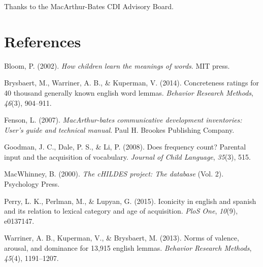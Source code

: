 \documentclass[10pt, letterpaper]{article}
\begin{document}
Thanks to the MacArthur-Bates CDI Advisory Board.

\section{References}\label{references}

\setlength{\parindent}{-0.1in} \setlength{\leftskip}{0.125in} \noindent

Bloom, P. (2002). \emph{How children learn the meanings of words}. MIT
press.

Brysbaert, M., Warriner, A. B., \& Kuperman, V. (2014). Concreteness
ratings for 40 thousand generally known english word lemmas.
\emph{Behavior Research Methods}, \emph{46}(3), 904--911.

Fenson, L. (2007). \emph{MacArthur-bates communicative development
inventories: User's guide and technical manual}. Paul H. Brookes
Publishing Company.

Goodman, J. C., Dale, P. S., \& Li, P. (2008). Does frequency count?
Parental input and the acquisition of vocabulary. \emph{Journal of Child
Language}, \emph{35}(3), 515.

MacWhinney, B. (2000). \emph{The cHILDES project: The database} (Vol.
2). Psychology Press.

Perry, L. K., Perlman, M., \& Lupyan, G. (2015). Iconicity in english
and spanish and its relation to lexical category and age of acquisition.
\emph{PloS One}, \emph{10}(9), e0137147.

Warriner, A. B., Kuperman, V., \& Brysbaert, M. (2013). Norms of
valence, arousal, and dominance for 13,915 english lemmas.
\emph{Behavior Research Methods}, \emph{45}(4), 1191--1207.
\end{document}
